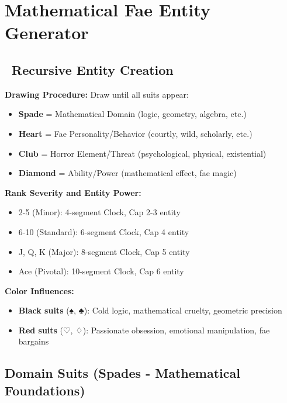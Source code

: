 \documentclass[11pt]{article}
\begin{document}
\section{Mathematical Fae Entity Generator}

\subsection*{\faRandom\ Recursive Entity Creation}

\textbf{Drawing Procedure:} Draw until all suits appear:
\begin{itemize}
    \item \textbf{Spade} = Mathematical Domain (logic, geometry, algebra, etc.)
    \item \textbf{Heart} = Fae Personality/Behavior (courtly, wild, scholarly, etc.)
    \item \textbf{Club} = Horror Element/Threat (psychological, physical, existential)
    \item \textbf{Diamond} = Ability/Power (mathematical effect, fae magic)
\end{itemize}

\textbf{Rank Severity and Entity Power:}
\begin{itemize}
    \item 2-5 (Minor): 4-segment Clock, Cap 2-3 entity
    \item 6-10 (Standard): 6-segment Clock, Cap 4 entity
    \item J, Q, K (Major): 8-segment Clock, Cap 5 entity
    \item Ace (Pivotal): 10-segment Clock, Cap 6 entity
\end{itemize}

\textbf{Color Influences:}
\begin{itemize}
    \item \textbf{Black suits} (♠, ♣): Cold logic, mathematical cruelty, geometric precision
    \item \textbf{Red suits} (♡, ♢): Passionate obsession, emotional manipulation, fae bargains
\end{itemize}

\subsection*{Domain Suits (Spades - Mathematical Foundations)}
\end{document}
